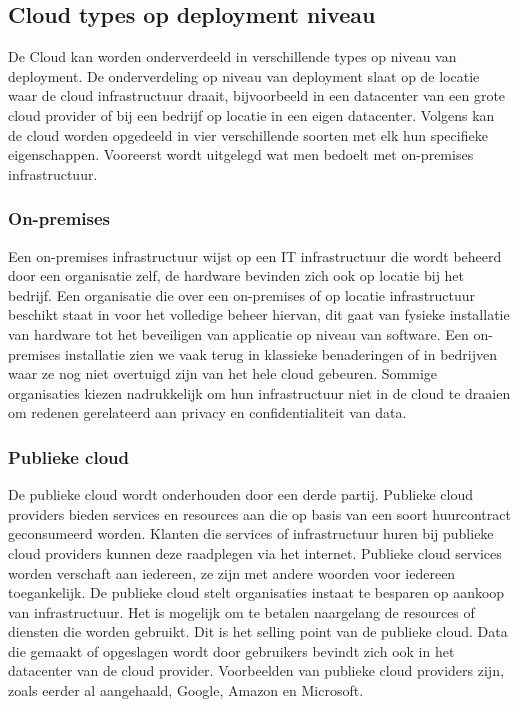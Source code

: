 \subsection{Cloud types op deployment niveau}
\label{cloud-deployment-level}
De Cloud kan worden onderverdeeld in verschillende types op niveau van deployment. De onderverdeling op niveau van deployment slaat op de locatie waar de cloud infrastructuur draait, bijvoorbeeld in een datacenter van een grote cloud provider of bij een bedrijf op locatie in een eigen datacenter. Volgens \textcite{Goyal2014} kan de cloud worden opgedeeld in vier verschillende soorten met elk hun specifieke eigenschappen. Vooreerst wordt uitgelegd wat men bedoelt met on-premises infrastructuur.

\subsubsection{On-premises}
Een on-premises infrastructuur wijst op een IT infrastructuur die wordt beheerd door een organisatie zelf, de hardware bevinden zich ook op locatie bij het bedrijf. Een organisatie die over een on-premises of op locatie infrastructuur beschikt staat in voor het volledige beheer hiervan, dit gaat van fysieke installatie van hardware tot het beveiligen van applicatie op niveau van software. Een on-premises installatie zien we vaak terug in klassieke benaderingen of in bedrijven waar ze nog niet overtuigd zijn van het hele cloud gebeuren. Sommige organisaties kiezen nadrukkelijk om hun infrastructuur niet in de cloud te draaien om redenen gerelateerd aan privacy en confidentialiteit van data.

\subsubsection{Publieke cloud}
De publieke cloud wordt onderhouden door een derde partij. Publieke cloud providers bieden services en resources aan die op basis van een soort huurcontract geconsumeerd worden. Klanten die services of infrastructuur huren bij publieke cloud providers kunnen deze raadplegen via het internet. Publieke cloud services worden verschaft aan iedereen, ze zijn met andere woorden voor iedereen toegankelijk. De publieke cloud stelt organisaties instaat te besparen op aankoop van infrastructuur. Het is mogelijk om te betalen naargelang de resources of diensten die worden gebruikt. Dit is het selling point van de publieke cloud. Data die gemaakt of opgeslagen wordt door gebruikers bevindt zich ook in het datacenter van de cloud provider. Voorbeelden van publieke cloud providers zijn, zoals eerder al aangehaald, Google, Amazon en Microsoft.

